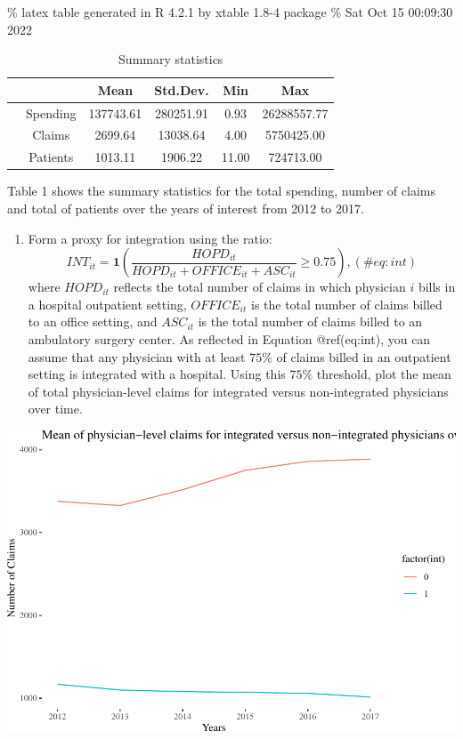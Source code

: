 \documentclass[
  12pt,
]{article}
\providecommand{\tightlist}{%
  \setlength{\itemsep}{0pt}\setlength{\parskip}{0pt}}
\begin{document}
\% latex table generated in R 4.2.1 by xtable 1.8-4 package \% Sat Oct
15 00:09:30 2022

\begin{table}[ht]
\centering
\begin{tabular}{cccccc}
  \hline
 &  & Mean & Std.Dev. & Min & Max \\ 
  \hline
 & Spending & 137743.61 & 280251.91 & 0.93 & 26288557.77 \\ 
   & Claims & 2699.64 & 13038.64 & 4.00 & 5750425.00 \\ 
   & Patients & 1013.11 & 1906.22 & 11.00 & 724713.00 \\ 
   \hline
\end{tabular}
\caption{Summary statistics} 
\label{tab:sum_stat}
\end{table}

Table 1 shows the summary statistics for the total spending, number of
claims and total of patients over the years of interest from 2012 to
2017.

\begin{enumerate}
\def\labelenumi{\arabic{enumi}.}
\setcounter{enumi}{1}
\tightlist
\item
  Form a proxy for integration using the ratio: \begin{equation}
   INT_{it} = \mathbf{1} \left(\frac{HOPD_{it}}{HOPD_{it} + OFFICE_{it} + ASC_{it}} \geq 0.75\right),
   (\#eq:int)
   \end{equation} where \(HOPD_{it}\) reflects the total number of
  claims in which physician \(i\) bills in a hospital outpatient
  setting, \(OFFICE_{it}\) is the total number of claims billed to an
  office setting, and \(ASC_{it}\) is the total number of claims billed
  to an ambulatory surgery center. As reflected in Equation
  @ref(eq:int), you can assume that any physician with at least \(75\%\)
  of claims billed in an outpatient setting is integrated with a
  hospital. Using this \(75\%\) threshold, plot the mean of total
  physician-level claims for integrated versus non-integrated physicians
  over time.
\end{enumerate}

\includegraphics{Report2_files/figure-latex/Q2, -1.pdf}
\end{document}
